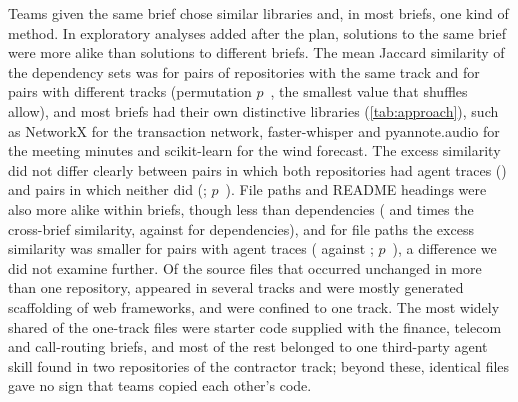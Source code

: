\documentclass{article}
\begin{document}
Teams given the same brief chose similar libraries and, in most briefs, one kind of method. In exploratory analyses added after the plan, solutions to the same brief were more alike than solutions to different briefs. The mean Jaccard similarity of the dependency sets was \NRqThreeSolutionsDepsWithin{} for pairs of repositories with the same track and \NRqThreeSolutionsDepsAcross{} for pairs with different tracks (permutation $p$~\NRqThreeSolutionsDepsP, the smallest value that \solruns{} shuffles allow), and most briefs had their own distinctive libraries (\cref{tab:approach}), such as NetworkX for the transaction network, faster-whisper and pyannote.audio for the meeting minutes and scikit-learn for the wind forecast. The excess similarity did not differ clearly between pairs in which both repositories had agent traces (\NRqThreeSolutionsDepsWithExcess) and pairs in which neither did (\NRqThreeSolutionsDepsWithoutExcess; $p$~\NRqThreeSolutionsDepsStatusP). File paths and README headings were also more alike within briefs, though less than dependencies (\NRqThreeSolutionsPathsRatio{} and \NRqThreeSolutionsHeadingsRatio{} times the cross-brief similarity, against \NRqThreeSolutionsDepsRatio{} for dependencies), and for file paths the excess similarity was smaller for pairs with agent traces (\NRqThreeSolutionsPathsWithExcess{} against \NRqThreeSolutionsPathsWithoutExcess; $p$~\NRqThreeSolutionsPathsStatusP), a difference we did not examine further. Of the source files that occurred unchanged in more than one repository, \NRqThreeSolutionsSharedFilesSeveralTracks{} appeared in several tracks and were mostly generated scaffolding of web frameworks, and \NRqThreeSolutionsSharedFilesOneTrack{} were confined to one track. The most widely shared of the one-track files were starter code supplied with the finance, telecom and call-routing briefs, and most of the rest belonged to one third-party agent skill found in two repositories of the contractor track; beyond these, identical files gave no sign that teams copied each other's code.
\end{document}
